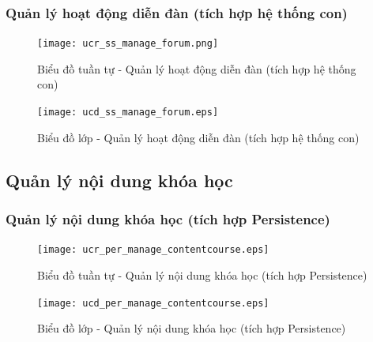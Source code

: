 \documentclass[./../main.tex]{subfiles}
\begin{document}
\subsubsection{Quản lý hoạt động diễn đàn (tích hợp hệ thống con)}
\begin{figure}[H]
    \centering
    \texttt{[image: ucr\_ss\_manage\_forum.png]}
    \caption{Biểu đồ tuần tự - Quản lý hoạt động diễn đàn (tích hợp hệ thống con)}
\end{figure}
\begin{figure}[H]
    \centering
    \texttt{[image: ucd\_ss\_manage\_forum.eps]}
    \caption{Biểu đồ lớp - Quản lý hoạt động diễn đàn (tích hợp hệ thống con)}
\end{figure}

\subsection{Quản lý nội dung khóa học}
\subsubsection{Quản lý nội dung khóa học (tích hợp Persistence)}
\begin{figure}[H]
    \centering
    \texttt{[image: ucr\_per\_manage\_contentcourse.eps]}
    \caption{Biểu đồ tuần tự - Quản lý nội dung khóa học (tích hợp Persistence)}
\end{figure}
\begin{figure}[H]
    \centering
    \texttt{[image: ucd\_per\_manage\_contentcourse.eps]}
    \caption{Biểu đồ lớp - Quản lý nội dung khóa học (tích hợp Persistence)}
\end{figure}
\end{document}
